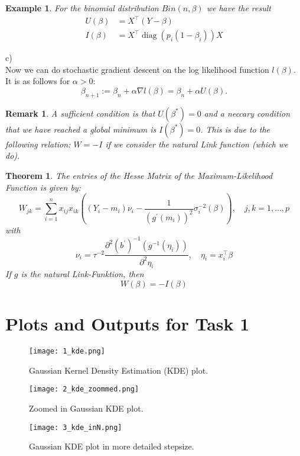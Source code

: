 \documentclass[a4paper,oneside,bibliography=totoc]{scrartcl}
\newtheorem{rem}{Remark}[section]
\newtheorem{Satz}{Theorem}[section]
\newtheorem{ex}{Example}[section]
\begin{document}
\begin{ex}
    For the binomial distribution $Bin(n,\beta)$ we have the result 
$$
\begin{aligned}
U(\beta) & =X^{\top}(Y-\beta) \\
I(\beta) & =X^{\top} \operatorname{diag}\left(p_i\left(1-\beta_i\right)\right) X
\end{aligned}
$$
\end{ex}
c)\\
Now we can do stochastic gradient descent on the log likelihood function $l(\beta)$. It is as follows for $\alpha >0:$
$$
\beta_{n+1} := \beta_n + \alpha \nabla l (\beta) = \beta_n + \alpha U(\beta).
$$

\begin{rem}
    A sufficient condition is that $U(\beta^*)=0$ and a neccary condition that we have reached a global minimum is $I(\beta^*)=0$. This is due to the following relation: $W = - I$ if we consider the natural Link function (which we do).
\end{rem}

\begin{Satz}
The entries of the Hesse Matrix of the Maximum-Likelihood Function is given by:
    $$
W_{j k}=\sum_{i=1}^n x_{i j} x_{i k}\left(\left(Y_i-m_i\right) \nu_i-\frac{1}{\left(g^{\prime}\left(m_i\right)\right)^2} \sigma_i^{-2}(\beta)\right), \quad j, k=1, \ldots, p
$$
with
$$
\nu_i=\tau^{-2} \frac{\partial^2\left(b^{\prime}\right)^{-1}\left(g^{-1}\left(\eta_i\right)\right)}{\partial^2 \eta_i}, \quad \eta_i=x_i^{\top} \beta
$$
If $g$ is the natural Link-Funktion, then
$$
W(\beta)=-I(\beta)
$$
\end{Satz}


\section{Plots and Outputs for Task 1}
\label{section1}

\begin{figure}[H]
    \centering
    \texttt{[image: 1\_kde.png]}
    \caption{Gaussian Kernel Density Estimation (KDE) plot.}
    \label{fig:1}
\end{figure}

\begin{figure}[H]
    \centering
    \texttt{[image: 2\_kde\_zoommed.png]}
    \caption{Zoomed in Gaussian KDE plot.}
    \label{fig:2}
\end{figure}

\begin{figure}[H]
    \centering
    \texttt{[image: 3\_kde\_inN.png]}
    \caption{Gaussian KDE plot in more detailed stepsize.}
    \label{fig:3}
\end{figure}
\end{document}
